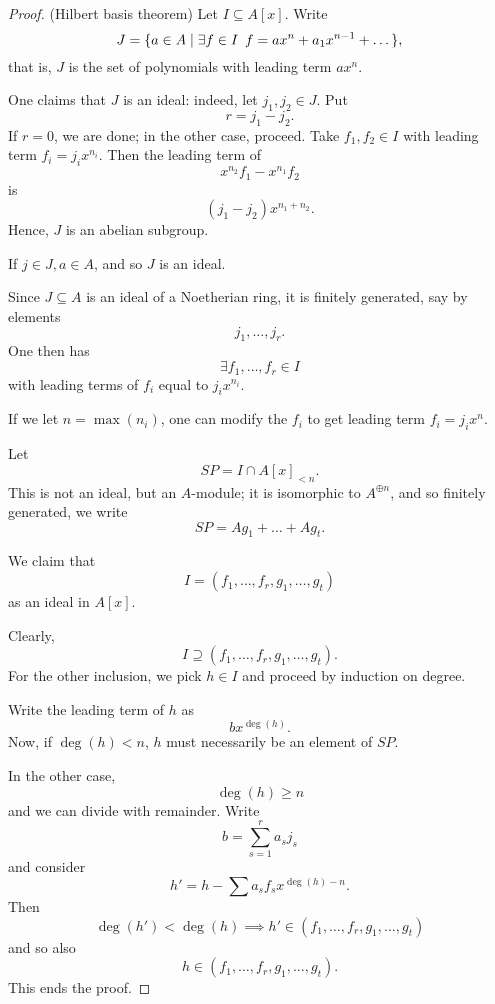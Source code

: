 \begin{proof} (Hilbert basis theorem)
  Let $I \subseteq A[x]$. Write
  \[ J = \{ a \in A \mathrel{|} \exists f \in I \enspace f = ax^n + a_1 x^{n-1} + \dotso \},\]
  that is, $J$ is the set of polynomials with leading term $ax^n$.

  One claims that $J$ is an ideal: indeed, let $j_1, j_2 \in J$. Put
  \[ r = j_1 - j_2.\]
  If $r=0$, we are done; in the other case, proceed.
  Take $f_1, f_2 \in I$ with leading term $f_i = j_i x^{n_i}$.
  Then the leading term of
  \[ x^{n_2} f_1 - x^{n_1} f_2\]
  is
  \[(j_1 - j_2) x^{n_1+n_2}.\]
  Hence, $J$ is an abelian subgroup.

  If $j \in J, a \in A$,
  and so $J$ is an ideal.

  Since $J \subseteq A$ is an ideal of a Noetherian ring, it is finitely generated, say by elements
  \[ j_1, \dotsc, j_r.\]
  One then has
  \[ \exists f_1, \dotsc, f_r \in I\]
  with leading terms of $f_i$ equal to $j_i x^{n_i}$.

  If we let $n = \max(n_i)$, one can modify the $f_i$ to get leading term $f_i = j_i x^n$.

  Let
  \[ SP = I \cap A[x]_{< n}.\]
  This is not an ideal, but an $A$-module; it is isomorphic to $A^{\oplus n}$, and so finitely generated, we write
  \[ SP = Ag_1 + \dotso + Ag_t.\]

  We claim that
  \[ I = (f_1, \dotsc, f_r, g_1, \dotsc, g_t)\]
  as an ideal in $A[x]$.

  Clearly,
  \[ I \supseteq (f_1, \dotsc, f_r, g_1, \dotsc, g_t).\]
  For the other inclusion, we pick $h \in I$ and proceed by induction on degree.

  Write the leading term of $h$ as
  \[ b x^{\deg(h)}.\]
  Now, if $\deg(h) < n$, $h$ must necessarily be an element of $SP$.

  In the other case,
  \[ \deg(h) \geq n\]
  and we can divide with remainder. Write
  \[ b = \sum_{s=1}^r a_s j_s\]
  and consider
  \[ h' = h - \sum a_s f_s x^{\deg(h)-n}.\]
  Then
  \[ \deg(h') < \deg(h) \implies h' \in (f_1, \dotsc, f_r, g_1, \dotsc, g_t)\]
  and so also
  \[ h \in (f_1, \dotsc, f_r, g_1, \dotsc, g_t).\]
  This ends the proof.
\end{proof}


